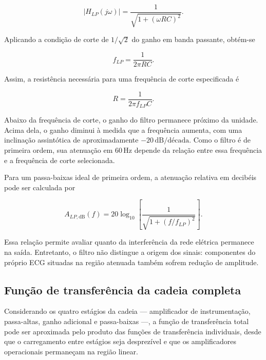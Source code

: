 \documentclass[11pt,a4paper]{article}
\begin{document}
\begin{equation}
\left|H_{LP}(j\omega)\right|
=
\frac{1}{\sqrt{1+(\omega RC)^2}}.
\label{eq:modulo_passa_baixas}
\end{equation}

Aplicando a condição de corte de $1/\sqrt{2}$ do ganho em banda passante, obtém-se

\begin{equation}
f_{LP}=\frac{1}{2\pi RC}.
\label{eq:corte_passa_baixas}
\end{equation}

Assim, a resistência necessária para uma frequência de corte especificada é

\begin{equation}
R=\frac{1}{2\pi f_{LP}C}.
\label{eq:resistor_passa_baixas}
\end{equation}

Abaixo da frequência de corte, o ganho do filtro permanece próximo da unidade. Acima dela, o ganho diminui à medida que a frequência aumenta, com uma inclinação assintótica de aproximadamente $-20\,\mathrm{dB/década}$. Como o filtro é de primeira ordem, sua atenuação em $60\,\mathrm{Hz}$ depende da relação entre essa frequência e a frequência de corte selecionada.

Para um passa-baixas ideal de primeira ordem, a atenuação relativa em decibéis pode ser calculada por

\begin{equation}
A_{LP,\mathrm{dB}}(f)
=
20\log_{10}
\left[
\frac{1}{\sqrt{1+(f/f_{LP})^2}}
\right].
\label{eq:atenuacao_passa_baixas}
\end{equation}

Essa relação permite avaliar quanto da interferência da rede elétrica permanece na saída. Entretanto, o filtro não distingue a origem dos sinais: componentes do próprio ECG situadas na região atenuada também sofrem redução de amplitude.

\subsection{Função de transferência da cadeia completa}

Considerando os quatro estágios da cadeia — amplificador de instrumentação, passa-altas, ganho adicional e passa-baixas —, a função de transferência total pode ser aproximada pelo produto das funções de transferência individuais, desde que o carregamento entre estágios seja desprezível e que os amplificadores operacionais permaneçam na região linear.
\end{document}
